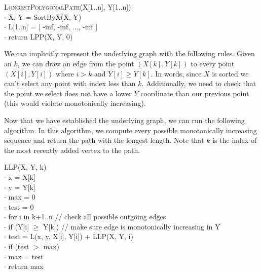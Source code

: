 \documentclass{article}
\begin{document}
\begin{enumerate}
        \begin{algorithm}
            \textsc{LongestPolygonalPath}(X[1..n], Y[1..n]) \\
            $\cdot $ \hspace{1em} X, Y = SortByX(X, Y) \\
            $\cdot $ \hspace{1em} L[1..n] = [ -inf, -inf, ..., -inf ] \\
            $\cdot $ \hspace{1em} return LPP(X, Y, 0)
        \end{algorithm}

        We can implicitly represent the underlying graph with the following rules. Given an $k$, we can draw an edge from the point $(X[k], Y[k])$ to every point $(X[i], Y[i])$ where $i > k$ and $Y[i] \geq Y[k]$. In words, since $X$ is sorted we can't select any point with index less than $k$. Additionally, we need to check that the point we select does not have a lower $Y$ coordinate than our previous point (this would violate monotonically increasing).

        Now that we have established the underlying graph, we can run the following algorithm. In this algorithm, we compute every possible monotonically increasing sequence and return the path with the longest length. Note that $k$ is the index of the most recently added vertex to the path.
        \newpage
        \begin{algorithm}
            \textsc{LLP}(X, Y, k) \\
            $\cdot $ \hspace{1em} x = X[k] \\
            $\cdot $ \hspace{1em} y = Y[k] \\
            $\cdot $ \hspace{1em} max  = 0 \\
            $\cdot $ \hspace{1em} test = 0 \\
            $\cdot $ \hspace{1em} for i in k+1..n // check all possible outgoing edges \\
            $\cdot $ \hspace{1em} if (Y[i] $\geq$ Y[k])	// make sure edge is monotonically increasing in Y \\
            $\cdot $ \hspace{2em} test = L(x, y, X[i], Y[i]) + \textsc{LLP}(X, Y, i) \\
            $\cdot $ \hspace{1em} if  (test $>$ max) \\
            $\cdot $ \hspace{2em} max = test \\
            $\cdot $ \hspace{1em} return max
        \end{algorithm}


\end{enumerate}
\end{document}

